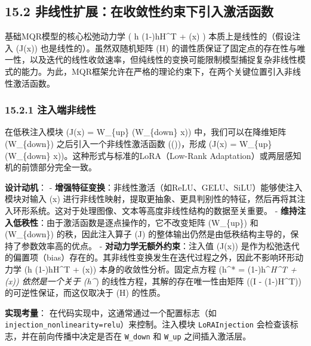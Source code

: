 \documentclass[
  12pt,
]{article}
\begin{document}
\hypertarget{ux975eux7ebfux6027ux6269ux5c55ux5728ux6536ux655bux6027ux7ea6ux675fux4e0bux5f15ux5165ux6fc0ux6d3bux51fdux6570}{%
\subsection{15.2
非线性扩展：在收敛性约束下引入激活函数}\label{ux975eux7ebfux6027ux6269ux5c55ux5728ux6536ux655bux6027ux7ea6ux675fux4e0bux5f15ux5165ux6fc0ux6d3bux51fdux6570}}

基础MQR模型的核心松弛动力学 ( h \leftarrow (1-\alpha)hH\^{}T +
\alphaJ(x) ) 本质上是线性的（假设注入 (J(x))
也是线性的）。虽然双随机矩阵 (H)
的谱性质保证了固定点的存在性与唯一性，以及迭代的线性收敛速率，但纯线性的变换可能限制模型捕捉复杂非线性模式的能力。为此，MQR框架允许在严格的理论约束下，在两个关键位置引入非线性激活函数。

\hypertarget{ux6ce8ux5165ux7aefux975eux7ebfux6027}{%
\subsubsection{15.2.1
注入端非线性}\label{ux6ce8ux5165ux7aefux975eux7ebfux6027}}

在低秩注入模块 (J(x) = W\_\{up\} \cdot (W\_\{down\} \cdot x))
中，我们可以在降维矩阵 (W\_\{down\}) 之后引入一个非线性激活函数
(\sigma(\cdot))，形成 (J(x) = W\_\{up\}
\cdot \sigma(W\_\{down\} \cdot x))。这种形式与标准的LoRA（Low-Rank
Adaptation）或两层感知机的前馈部分完全一致。

\textbf{设计动机}： -
\textbf{增强特征变换}：非线性激活（如ReLU、GELU、SiLU）能够使注入模块对输入
(x)
进行非线性映射，提取更抽象、更具判别性的特征，然后再将其注入环形系统。这对于处理图像、文本等高度非线性结构的数据至关重要。
- \textbf{维持注入低秩性}：由于激活函数是逐点操作的，它不改变矩阵
(W\_\{up\}) 和 (W\_\{down\}) 的秩，因此注入算子 (J)
的整体输出仍然是由低秩结构主导的，保持了参数效率高的优点。 -
\textbf{对动力学无额外约束}：注入值 (J(x))
是作为松弛迭代的偏置项（bias）存在的。其非线性变换发生在迭代过程之外，因此不影响环形动力学
(h \leftarrow (1-\alpha)hH\^{}T + \alphaJ(x))
本身的收敛性分析。固定点方程 (h\^{}* = (1-\alpha)h\^{}\emph{H\^{}T +
\alphaJ(x)) 依然是一个关于 (h\^{}})
的线性方程，其解的存在唯一性由矩阵 ((I - (1-\alpha)H\^{}T))
的可逆性保证，而这仅取决于 (H) 的性质。

\textbf{实现考量}： 在代码实现中，这通常通过一个配置标志（如
\texttt{injection\_nonlinearity=\textquotesingle{}relu\textquotesingle{}}）来控制。注入模块
\texttt{LoRAInjection} 会检查该标志，并在前向传播中决定是否在
\texttt{W\_down} 和 \texttt{W\_up} 之间插入激活层。
\end{document}
